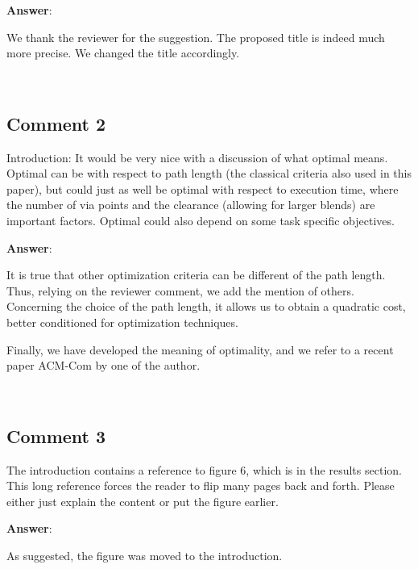 \documentclass{scrartcl}
\begin{document}
\vspace{0.5cm}

\textbf{Answer}:

We thank the reviewer for the suggestion. The proposed title is indeed much more precise. We changed the title accordingly.

\noindent
\hrulefill\\

\subsection{Comment 2}

Introduction: 
It would be very nice with a discussion of what optimal means. Optimal can be with respect to path length (the classical criteria also used in this paper), but could just as well be optimal with respect to execution time, where the number of via points and the clearance (allowing for larger blends) are important factors. Optimal could also depend on some task specific objectives. 

\vspace{0.5cm}

\textbf{Answer}:

It is true that other optimization criteria can be different of the path length. 
Thus, relying on the reviewer comment, we add the mention of others. Concerning 
the choice of the path length, it allows us to obtain a quadratic cost, better 
conditioned for optimization techniques.

Finally, we have developed the meaning of optimality, and we refer to a 
recent paper ACM-Com by one of the author.

\noindent
\hrulefill\\

\subsection{Comment 3}

The introduction contains a reference to figure 6, which is in the results section. This long reference forces the reader to flip many pages back and forth. Please either just explain the content or put the figure earlier.

\vspace{0.5cm}

\textbf{Answer}:

As suggested, the figure was moved to the introduction.
\end{document}
